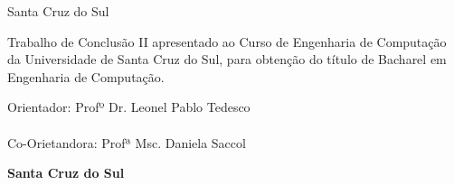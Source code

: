 \begin{titlepage}
\thispagestyle{empty}
	\begin{center}
	\par \vspace{250pt} {\textsc \nomedocurso} %
	\par \vspace{150pt} {\nomedoaluno} %
	\par \vspace{100pt}{\textbf{\textsc{\titulo}}} %
	\par \vfill {{Santa Cruz do Sul}\\ {\the\year}}
	\end{center}
\end{titlepage}

\thispagestyle{empty}
\begin{center}
	\par {\nomedoaluno}
	\par \vspace{100pt}{\textbf{\textsc{\titulo}}}
\end{center}
\par \vspace{90pt} \hspace*{150pt}\parbox{9cm}{{\large Trabalho de Conclusão II apresentado ao Curso de Engenharia de Computação da Universidade de Santa Cruz do Sul, para obtenção do título de Bacharel em Engenharia de Computação.}}
\par
\vspace{1cm}
\hspace*{150pt}\parbox{9cm}{{
	Orientador: Profº Dr. Leonel Pablo Tedesco
	\\
	\\
	Co-Orietandora: Profª Msc. Daniela Saccol
	}}
\vspace{2cm}
\par
\vfill
\begin{center}
	\textbf{{Santa Cruz do Sul}\\ {\the\year}}
\end{center}

